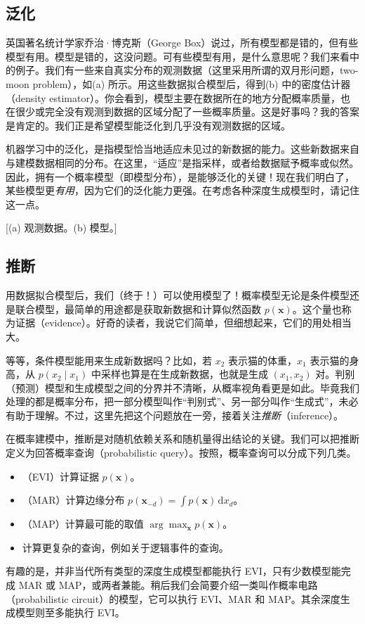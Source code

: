 \subsection{泛化}
英国著名统计学家乔治·博克斯（George Box）说过，所有模型都是错的，但有些模型有用。模型是错的，这没问题。可有些模型有用，是什么意思呢？我们来看中的例子。我们有一些来自真实分布的观测数据（这里采用所谓的双月形问题，two-moon problem），如(a) 所示。用这些数据拟合模型后，得到(b) 中的密度估计器（density estimator）。你会看到，模型主要在数据所在的地方分配概率质量，也在很少或完全没有观测到数据的区域分配了一些概率质量。这是好事吗？我的答案是肯定的。我们正是希望模型能泛化到几乎没有观测数据的区域。

机器学习中的泛化，是指模型恰当地适应未见过的新数据的能力。这些新数据来自与建模数据相同的分布。在这里，“适应”是指采样，或者给数据赋予概率或似然。因此，拥有一个概率模型（即模型分布），是能够泛化的关键！现在我们明白了，某些模型更\emph{有用}，因为它们的泛化能力更强。在考虑各种深度生成模型时，请记住这一点。

[(a) 观测数据。(b) 模型。]

\subsection{推断}
用数据拟合模型后，我们（终于！）可以使用模型了！概率模型无论是条件模型还是联合模型，最简单的用途都是获取新数据和计算似然函数 $p(\mathbf{x})$。这个量也称为证据（evidence）。好奇的读者，我说它们简单，但细想起来，它们的用处相当大。

等等，条件模型能用来生成新数据吗？比如，若 $x_2$ 表示猫的体重，$x_1$ 表示猫的身高，从 $p(x_2\mid x_1)$ 中采样也算是在生成新数据，也就是生成 $(x_1,x_2)$ 对。判别（预测）模型和生成模型之间的分界并不清晰，从概率视角看更是如此。毕竟我们处理的都是概率分布，把一部分模型叫作“判别式”、另一部分叫作“生成式”，未必有助于理解。不过，这里先把这个问题放在一旁，接着关注\emph{推断}（inference）。

在概率建模中，推断是对随机依赖关系和随机量得出结论的关键。我们可以把推断定义为回答概率查询（probabilistic query）。按照，概率查询可以分成下列几类。
\begin{itemize}
\item （EVI）计算证据 $p(\mathbf{x})$。
\item （MAR）计算边缘分布 $p(\mathbf{x}_{-d})=\int p(\mathbf{x})\,\mathrm{d}x_d$。
\item （MAP）计算最可能的取值 $\arg\max_{\mathbf{x}}p(\mathbf{x})$。
\item 计算更复杂的查询，例如关于逻辑事件的查询。
\end{itemize}
有趣的是，并非当代所有类型的深度生成模型都能执行 EVI，只有少数模型能完成 MAR 或 MAP，或两者兼能。稍后我们会简要介绍一类叫作概率电路（probabilistic circuit）的模型，它可以执行 EVI、MAR 和 MAP。其余深度生成模型则至多能执行 EVI。

